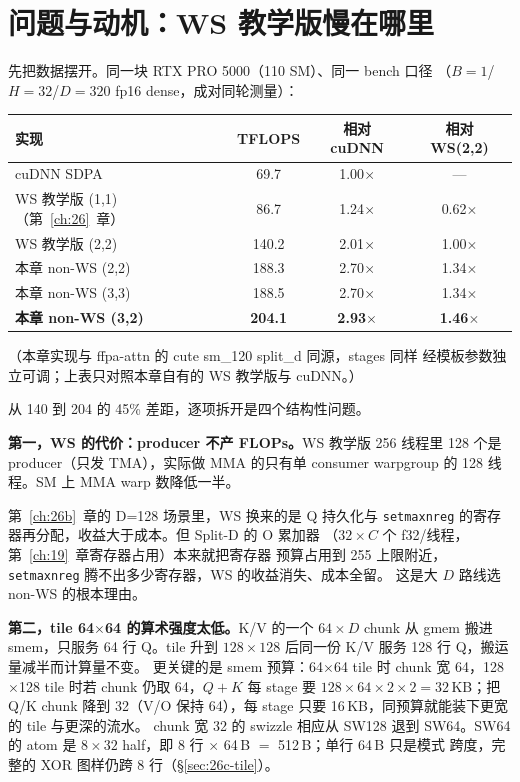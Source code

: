\section{问题与动机：WS 教学版慢在哪里}\label{sec:26c-motivation}

先把数据摆开。同一块 RTX PRO 5000（110 SM）、同一 bench 口径
（$B{=}1$/$H{=}32$/$D{=}320$ fp16 dense，成对同轮测量）：

\begin{center}
\begin{tabular}{lccc}
\toprule
实现 & TFLOPS & 相对 cuDNN & 相对 WS(2,2) \\
\midrule
cuDNN SDPA & 69.7 & 1.00$\times$ & --- \\
WS 教学版 (1,1)（第~\ref{ch:26}~章） & 86.7 & 1.24$\times$ & 0.62$\times$ \\
WS 教学版 (2,2) & 140.2 & 2.01$\times$ & 1.00$\times$ \\
本章 non-WS (2,2) & 188.3 & 2.70$\times$ & 1.34$\times$ \\
本章 non-WS (3,3) & 188.5 & 2.70$\times$ & 1.34$\times$ \\
\textbf{本章 non-WS (3,2)} & \textbf{204.1} & \textbf{2.93$\times$} & \textbf{1.46$\times$} \\
\bottomrule
\end{tabular}
\end{center}

（本章实现与 ffpa-attn 的 cute sm\_120 split\_d 同源，stages 同样
经模板参数独立可调；上表只对照本章自有的 WS 教学版与 cuDNN。）

从 140 到 204 的 45\% 差距，逐项拆开是四个结构性问题。

\textbf{第一，WS 的代价：producer 不产 FLOPs。}WS 教学版 256 线程里
128 个是 producer（只发 TMA），实际做 MMA 的只有单 consumer warpgroup
的 128 线程。SM 上 MMA warp 数降低一半。

第~\ref{ch:26b}~章的 D=128 场景里，WS 换来的是 Q 持久化与
\texttt{setmaxnreg} 的寄存器再分配，收益大于成本。但 Split-D 的 O 累加器
（$32 \times C$ 个 f32/线程，第~\ref{ch:19}~章寄存器占用）本来就把寄存器
预算占用到 255 上限附近，
\texttt{setmaxnreg} 腾不出多少寄存器，WS 的收益消失、成本全留。
这是大 $D$ 路线选 non-WS 的根本理由。

\textbf{第二，tile 64$\times$64 的算术强度太低。}K/V 的一个
$64\times D$ chunk 从 gmem 搬进 smem，只服务 64 行 Q。tile 升到
$128\times128$ 后同一份 K/V 服务 128 行 Q，搬运量减半而计算量不变。
更关键的是 smem 预算：64$\times$64 tile 时 chunk 宽 64，128$\times$128
tile 时若 chunk 仍取 64，$Q{+}K$ 每 stage 要
$128{\times}64{\times}2 \times 2 = 32$\,KB；把 Q/K chunk 降到 32（V/O 保持
64），每 stage 只要 16\,KB，同预算就能装下更宽的 tile 与更深的流水。
chunk 宽 32 的 swizzle 相应从 SW128 退到 SW64。SW64 的 atom 是
$8\times32$ half，即 8 行 $\times$ 64\,B $=$ 512\,B；单行 64\,B 只是模式
跨度，完整的 XOR 图样仍跨 8 行（\S\ref{sec:26c-tile}）。

